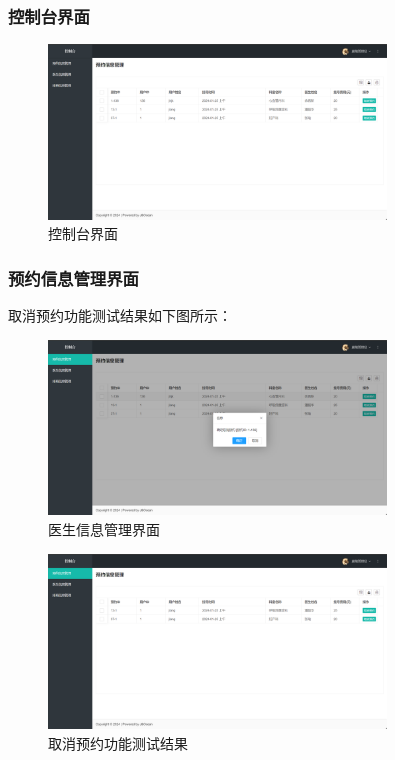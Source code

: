 \documentclass[UTF8,12pt]{article}
\begin{document}
\subsubsection{控制台界面}

\begin{figure}[htbp]
    \centering
    \includegraphics[width=0.8\textwidth]{imgs/34.png}
    \caption{控制台界面}
\end{figure}

\newpage

\subsubsection{预约信息管理界面}
取消预约功能测试结果如下图所示：

\begin{figure}[htbp]
    \centering
    \includegraphics[width=0.8\textwidth]{imgs/35.png}
    \caption{医生信息管理界面}
\end{figure}

\begin{figure}[htbp]
    \centering
    \includegraphics[width=0.8\textwidth]{imgs/36.png}
    \caption{取消预约功能测试结果}
\end{figure}
\end{document}
